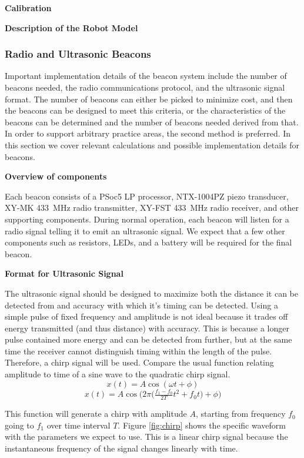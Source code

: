 \documentclass{article}
\begin{document}
      \textbf{Calibration}

      \textbf{Description of the Robot Model}

    \subsubsection{Radio and Ultrasonic Beacons}

      Important implementation details of the beacon system include the number of beacons needed, the radio communications protocol, and the ultrasonic signal format. The number of beacons can either be picked to minimize cost, and then the beacons can be designed to meet this criteria, or the characteristics of the beacons can be determined and the number of beacons needed derived from that. In order to support arbitrary practice areas, the second method is preferred. In this section we cover relevant calculations and possible implementation details for beacons.

      \textbf{Overview of components}

      Each beacon consists of a PSoc5 LP processor, NTX-1004PZ piezo transducer, XY-MK \SI{433}{\mega\hertz} radio transmitter, XY-FST \SI{433}{\mega\hertz} radio receiver, and other supporting components. During normal operation, each beacon will listen for a radio signal telling it to emit an ultrasonic signal. We expect that a few other components such as resistors, LEDs, and a battery will be required for the final beacon.

      \textbf{Format for Ultrasonic Signal}

      The ultrasonic signal should be designed to maximize both the distance it can be detected from and accuracy with which it's timing can be detected. Using a simple pulse of fixed frequency and amplitude is not ideal because it trades off energy transmitted (and thus distance) with accuracy. This is because a longer pulse contained more energy and can be detected from further, but at the same time the receiver cannot distinguish timing within the length of the pulse. Therefore, a chirp signal will be used. Compare the usual function relating amplitude to time of a sine wave to the quadratic chirp signal.
      $$ x(t) = A\cos(\omega t + \phi) $$
      $$ x(t) = A\cos\bigg(2\pi\Big(\tfrac{f_1 - f_0}{2T}t^2+f_0t\Big) + \phi\bigg) $$

      This function will generate a chirp with amplitude $A$, starting from frequency $f_0$ going to $f_1$ over time interval $T$. Figure \ref{fig:chirp} shows the specific waveform with the parameters we expect to use. This is a linear chirp signal because the instantaneous frequency of the signal changes linearly with time.
\end{document}
